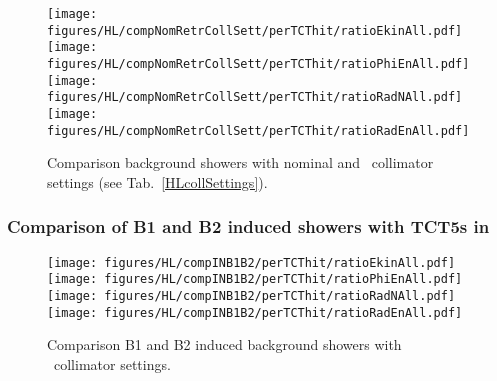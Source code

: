 \begin{figure}
\begin{center}
\texttt{[image: figures/HL/compNomRetrCollSett/perTCThit/ratioEkinAll.pdf]}
\texttt{[image: figures/HL/compNomRetrCollSett/perTCThit/ratioPhiEnAll.pdf]}
\texttt{[image: figures/HL/compNomRetrCollSett/perTCThit/ratioRadNAll.pdf]}
\texttt{[image: figures/HL/compNomRetrCollSett/perTCThit/ratioRadEnAll.pdf]}
\end{center}
\vspace{-0.6cm}
 \caption{Comparison background showers with nominal and \twosigmaret~collimator settings (see Tab.~\ref{HLcollSettings}).
  \label{compNomRetrSett}}
\end{figure}

\subsubsection{Comparison of B1 and B2 induced showers with TCT5s in}


\begin{figure}
\begin{center}
\texttt{[image: figures/HL/compINB1B2/perTCThit/ratioEkinAll.pdf]}
\texttt{[image: figures/HL/compINB1B2/perTCThit/ratioPhiEnAll.pdf]}
\texttt{[image: figures/HL/compINB1B2/perTCThit/ratioRadNAll.pdf]}
\texttt{[image: figures/HL/compINB1B2/perTCThit/ratioRadEnAll.pdf]}
\end{center}
\vspace{-0.6cm}
 \caption{Comparison B1 and B2 induced background showers with \twosigmaret~collimator settings.
  \label{compINB1B2}}
\end{figure}
